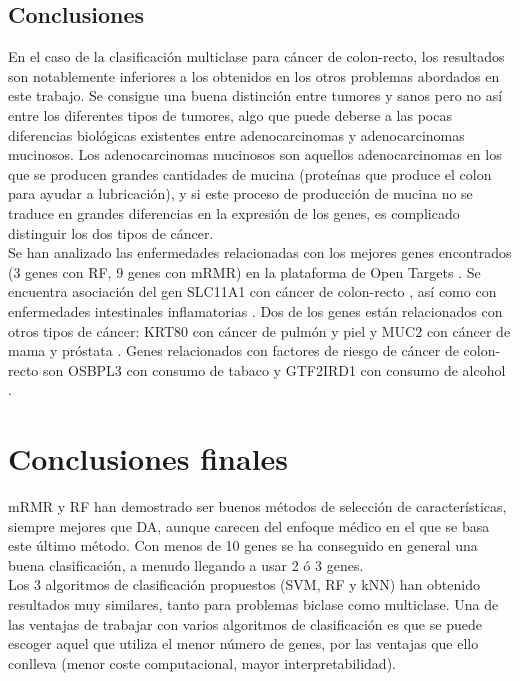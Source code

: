 \subsection{Conclusiones}

En el caso de la clasificación multiclase para cáncer de colon-recto, los resultados son notablemente inferiores a los obtenidos en los otros problemas abordados en este trabajo. Se consigue una buena distinción entre tumores y sanos pero no así entre los diferentes tipos de tumores, algo que puede deberse a las pocas diferencias biológicas existentes entre adenocarcinomas y adenocarcinomas mucinosos. Los adenocarcinomas mucinosos son aquellos adenocarcinomas en los que se producen grandes cantidades de mucina (proteínas que produce el colon para ayudar a lubricación), y si este proceso de producción de mucina no se traduce en grandes diferencias en la expresión de los genes, es complicado distinguir los dos tipos de cáncer. \\

Se han analizado las enfermedades relacionadas con los mejores genes encontrados (3 genes con RF, 9 genes con mRMR) en la plataforma de Open Targets \cite{OpenTargets2020}. Se encuentra asociación del gen SLC11A1 con cáncer de colon-recto \cite{Law2019, Tanskanen2018, Huyghe2019}, así como con enfermedades intestinales inflamatorias \cite{Jostins2012, DeLange2017}. Dos de los genes están relacionados con otros tipos de cáncer: KRT80 con cáncer de pulmón \cite{Wang2016}  y piel \cite{biobank} y MUC2 con cáncer de mama \cite{Michailidou2017a} y próstata \cite{Schumacher2018}. Genes relacionados con factores de riesgo de cáncer de colon-recto son OSBPL3 con consumo de tabaco \cite{Liu2019} y GTF2IRD1 con consumo de alcohol \cite{biobank}.

\section{Conclusiones finales}

mRMR y RF han demostrado ser buenos métodos de selección de características, siempre mejores que DA, aunque carecen del enfoque médico en el que se basa este último método. Con menos de 10 genes se ha conseguido en general una buena clasificación, a menudo llegando a usar 2 ó 3 genes.\\

Los 3 algoritmos de clasificación propuestos (SVM, RF y kNN) han obtenido resultados muy similares, tanto para problemas biclase como multiclase. Una de las ventajas de trabajar con varios algoritmos de clasificación es que se puede escoger aquel que utiliza el menor número de genes, por las ventajas que ello conlleva (menor coste computacional, mayor interpretabilidad).\\

